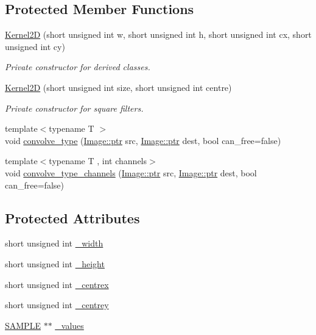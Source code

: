 \subsection*{Protected Member Functions}
\begin{DoxyCompactItemize}
\item 
\hyperlink{class_photo_finish_1_1_kernel2_d_a43c7b680295addf6ec51d57be59af461}{Kernel2D} (short unsigned int w, short unsigned int h, short unsigned int cx, short unsigned int cy)
\begin{DoxyCompactList}\small\item\em Private constructor for derived classes. \end{DoxyCompactList}\item 
\hyperlink{class_photo_finish_1_1_kernel2_d_abaf8fb7dc013f446340bd920f18a9a0d}{Kernel2D} (short unsigned int size, short unsigned int centre)
\begin{DoxyCompactList}\small\item\em Private constructor for square filters. \end{DoxyCompactList}\item 
{\footnotesize template$<$typename T $>$ }\\void \hyperlink{class_photo_finish_1_1_kernel2_d_ad3480df55b7e5ef7e3cd49d9c30d9ca3}{convolve\+\_\+type} (\hyperlink{class_photo_finish_1_1_image_ab336203305ed3a1397d7245063353b5a}{Image\+::ptr} src, \hyperlink{class_photo_finish_1_1_image_ab336203305ed3a1397d7245063353b5a}{Image\+::ptr} dest, bool can\+\_\+free=false)
\item 
{\footnotesize template$<$typename T , int channels$>$ }\\void \hyperlink{class_photo_finish_1_1_kernel2_d_abc243c488ecf5d4c435a6ff3e668286b}{convolve\+\_\+type\+\_\+channels} (\hyperlink{class_photo_finish_1_1_image_ab336203305ed3a1397d7245063353b5a}{Image\+::ptr} src, \hyperlink{class_photo_finish_1_1_image_ab336203305ed3a1397d7245063353b5a}{Image\+::ptr} dest, bool can\+\_\+free=false)
\end{DoxyCompactItemize}
\subsection*{Protected Attributes}
\begin{DoxyCompactItemize}
\item 
short unsigned int \hyperlink{class_photo_finish_1_1_kernel2_d_a1e47b71f4a0f09cc0cd9378d43aaba06}{\+\_\+width}
\item 
short unsigned int \hyperlink{class_photo_finish_1_1_kernel2_d_aa0b063aa148d574a833e6f4404c3b920}{\+\_\+height}
\item 
short unsigned int \hyperlink{class_photo_finish_1_1_kernel2_d_a184056430bd255f5ce75c67571304459}{\+\_\+centrex}
\item 
short unsigned int \hyperlink{class_photo_finish_1_1_kernel2_d_a4db11cdb4c2651d3f1b60c339fe908f6}{\+\_\+centrey}
\item 
\hyperlink{sample_8h_afc597c76b4f04a2da506a240d51d89a0}{S\+A\+M\+P\+LE} $\ast$$\ast$ \hyperlink{class_photo_finish_1_1_kernel2_d_a6210ca195130ad534ac7971b3a68f1e3}{\+\_\+values}
\end{DoxyCompactItemize}


